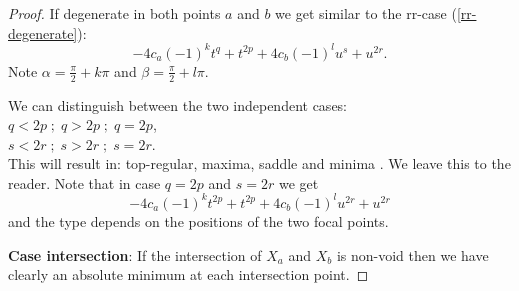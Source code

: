 \documentclass[10pt,a4paper]{amsart}
\begin{document}
\begin{proof}
If degenerate in both points $a$ and $b$ we get similar to the rr-case (\ref{rr-degenerate}):
$$  -4 c_a (-1)^k t^q +t^{2 p} +4 c_b (-1)^l u^s+u^{2 r}.$$
Note $  \alpha = \frac{\pi}{2} + k \pi$ and $\beta = \frac{\pi}{2} + l \pi$. 

We can distinguish between  the two independent cases:\\
$q < 2p \; ; \; q > 2p \; ; \; q = 2p$,\\
$s < 2r \; ; \; s > 2r \; ; \; s = 2r$.\\
This will result in: top-regular, maxima, saddle and minima . We leave this to the reader.
Note that in case $q=2p$ and $s=2r$ we get
\begin{equation}
 -4 c_a (-1)^k t^{2p} +t^{2 p} +4 c_b (-1)^l u^{2r}+u^{2 r}
\end{equation}
and the type depends on the positions of the two focal points.

{\bf Case intersection}: If the intersection of $X_a$ and $X_b$ is non-void then we have clearly an absolute minimum at each intersection point.
\end{proof}
\end{document}
